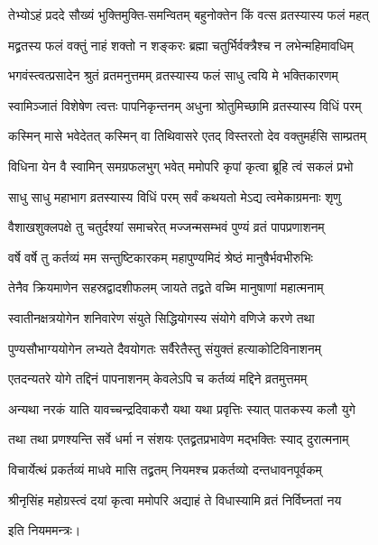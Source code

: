 \twolineshloka
{तेभ्योऽहं प्रददे सौख्यं भुक्तिमुक्ति-समन्वितम्}
{बहुनोक्तेन किं वत्स व्रतस्यास्य फलं महत्} %

\twolineshloka
{मद्व्रतस्य फलं वक्तुं नाहं शक्तो न शङ्करः}
{ब्रह्मा चतुर्भिर्वक्त्रैश्च न लभेन्महिमावधिम्} %

\twolineshloka
{भगवंस्त्वत्प्रसादेन श्रुतं व्रतमनुत्तमम्}
{व्रतस्यास्य फलं साधु त्वयि मे भक्तिकारणम्} %

\twolineshloka
{स्वामिञ्जातं विशेषेण त्वत्तः पापनिकृन्तनम्}
{अधुना श्रोतुमिच्छामि व्रतस्यास्य विधिं परम्} %

\twolineshloka
{कस्मिन् मासे भवेदेतत् कस्मिन् वा तिथिवासरे}
{एतद् विस्तरतो देव वक्तुमर्हसि साम्प्रतम्} %

\twolineshloka
{विधिना येन वै स्वामिन् समग्रफलभुग् भवेत्}
{ममोपरि कृपां कृत्वा ब्रूहि त्वं सकलं प्रभो} %


\twolineshloka
{साधु साधु महाभाग व्रतस्यास्य विधिं परम्}
{सर्वं कथयतो मेऽद्य त्वमेकाग्रमनाः शृणु} %

\twolineshloka
{वैशाखशुक्लपक्षे तु चतुर्दश्यां समाचरेत्}
{मज्जन्मसम्भवं पुण्यं व्रतं पापप्रणाशनम्} %


\twolineshloka
{वर्षे वर्षे तु कर्तव्यं मम सन्तुष्टिकारकम्}
{महापुण्यमिदं श्रेष्ठं मानुषैर्भवभीरुभिः} %

\twolineshloka
{तेनैव क्रियमाणेन सहस्रद्वादशीफलम्}
{जायते तद्व्रते वच्मि मानुषाणां महात्मनाम्} %

\twolineshloka
{स्वातीनक्षत्रयोगेन शनिवारेण संयुते}
{सिद्धियोगस्य संयोगे वणिजे करणे तथा} %

\twolineshloka
{पुण्यसौभाग्ययोगेन लभ्यते दैवयोगतः}
{सर्वैरेतैस्तु संयुक्तं हत्याकोटिविनाशनम्} %

\twolineshloka
{एतदन्यतरे योगे तद्दिनं पापनाशनम्}
{केवलेऽपि च कर्तव्यं मद्दिने व्रतमुत्तमम्} %

\twolineshloka
{अन्यथा नरकं याति यावच्चन्द्रदिवाकरौ}
{यथा यथा प्रवृत्तिः स्यात् पातकस्य कलौ युगे} %

\twolineshloka
{तथा तथा प्रणश्यन्ति सर्वे धर्मा न संशयः}
{एतद्व्रतप्रभावेण मद्भक्तिः स्याद् दुरात्मनाम्} %


\twolineshloka
{विचार्येत्थं प्रकर्तव्यं माधवे मासि तद्व्रतम्}
{नियमश्च प्रकर्तव्यो दन्तधावनपूर्वकम्} %


\twolineshloka
{श्रीनृसिंह महोग्रस्त्वं दयां कृत्वा ममोपरि}
{अद्याहं ते विधास्यामि व्रतं निर्विघ्नतां नय} %

इति नियममन्त्रः।

